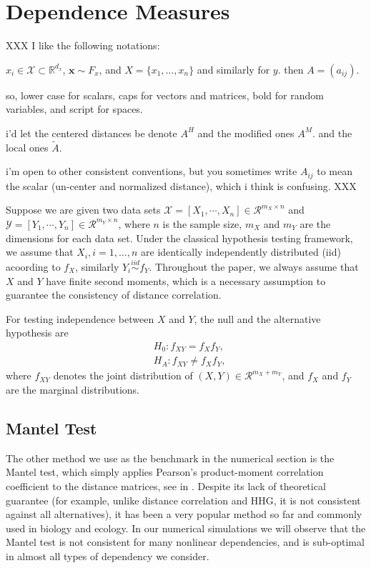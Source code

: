 \documentclass[11pt]{article}
\providecommand{\mt}[1]{\widetilde{#1}}
\providecommand{\mb}[1]{\boldsymbol{#1}}
\providecommand{\mc}[1]{\mathcal{#1}}
\newcommand{\Real}{\mathbb{R}}
\begin{document}
\section{Dependence Measures}
\label{main}

XXX I like the following notations:

$x_i \in \mc{X} \subset \Real^{d_x}$, $\mb{x} \sim F_x$, and $X=\{x_1,\ldots,x_n\}$ and similarly for $y$. then $A=(a_{ij})$. 

so, lower case for scalars, caps for vectors and matrices, bold for random variables, and script for spaces.  

i'd let the centered distances be denote $A^H$ and the modified ones $A^M$.
and the local ones $\mt{A}$.

i'm open to other consistent conventions, but you sometimes write $A_{ij}$ to mean the scalar (un-center and normalized distance), which i think is confusing.
XXX


Suppose we are given two data sets $\mathcal{X}=[X_{1},\cdots, X_{n}] \in \mathcal{R}^{m_{X} \times n}$ and $\mathcal{Y}=[Y_{1},\cdots, Y_{n}] \in \mathcal{R}^{m_{Y} \times n}$, where $n$ is the sample size, $m_{X}$ and $m_{Y}$ are the dimensions for each data set. Under the classical hypothesis testing framework, we assume that $X_{i}, i=1,\ldots,n$ are identically independently distributed (iid) acoording to $f_X$, similarly $Y_{i} \stackrel{iid}{\sim} f_Y$. Throughout the paper, we always assume that $X$ and $Y$ have finite second moments, which is a necessary assumption to guarantee the consistency of distance correlation.

For testing independence between $X$ and $Y$, the null and the alternative hypothesis are
\begin{align*}
& H_{0}: f_{XY}=f_{X}f_{Y},\\
& H_{A}: f_{XY} \neq f_{X}f_{Y},
\end{align*}
where $f_{XY}$ denotes the joint distribution of $(X,Y) \in \mathcal{R}^{m_{X}+m_{Y}}$, and $f_{X}$ and $f_{Y}$ are the marginal distributions. 


\subsection{Mantel Test}
\label{sec:hhg}



The other method we use as the benchmark in the numerical section is the Mantel test, which simply applies Pearson's product-moment correlation coefficient  to the distance matrices, see in \cite{Mantel1967}. Despite its lack of theoretical guarantee (for example, unlike distance correlation and HHG, it is not consistent against all alternatives), it has been a very popular method so far and commonly used in biology and ecology. In our numerical simulations we will observe that the Mantel test is not consistent for many nonlinear dependencies, and is sub-optimal in almost all types of dependency we consider.
\end{document}
